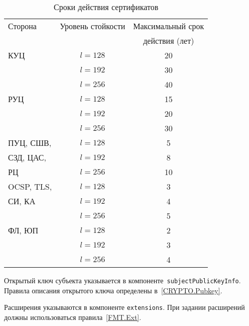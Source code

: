 \begin{table}
\caption{Сроки действия сертификатов}
\label{Table.CERT.Validity}
\begin{tabular}{|l|c|c|}
\hline
Сторона & Уровень стойкости & Максимальный срок\\
        &                   & действия (лет)\\
\hline
\hline

КУЦ & $l=128$ & 20\\
\cline{2-3} & $l=192$ & 30\\
\cline{2-3} & $l=256$ & 40\\
\hline

РУЦ & $l=128$ & 15\\
\cline{2-3} & $l=192$ & 20\\
\cline{2-3} & $l=256$ & 30\\
\hline

ПУЦ, СШВ,    & $l=128$ & 5\\
\cline{2-3}
СЗД, ЦАС,    & $l=192$ & 8\\
\cline{2-3} 
РЦ           & $l=256$ & 10\\
\hline

OCSP, TLS,  & $l=128$ & 3 \\
\cline{2-3}
СИ, КА & $l=192$ & 4\\
\cline{2-3} & $l=256$ & 5\\
\hline

ФЛ, ЮП & $l=128$ & 2 \\
\cline{2-3} & $l=192$ & 3 \\
\cline{2-3} & $l=256$ & 4 \\
\hline
\end{tabular}
\end{table}

Открытый ключ субъекта указывается в
компоненте~\texttt{subjectPublicKeyInfo}. Правила описания открытого ключа
определены в~\ref{CRYPTO.Pubkey}.

Расширения указываются в компоненте \texttt{еxtensions}. При задании
расширений должны использоваться правила~\ref{FMT.Ext}.
